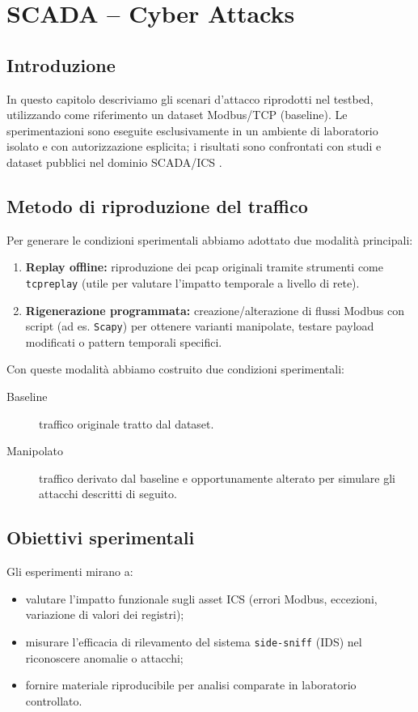 \chapter{SCADA -- Cyber Attacks}
\label{ch:scada_attacks}

\section{Introduzione}
In questo capitolo descriviamo gli scenari d'attacco riprodotti nel testbed, utilizzando come riferimento un dataset Modbus/TCP (baseline).  
Le sperimentazioni sono eseguite esclusivamente in un ambiente di laboratorio isolato e con autorizzazione esplicita; i risultati sono confrontati con studi e dataset pubblici nel dominio SCADA/ICS \cite{scadaAttacks,DatasetModbus}.

\section{Metodo di riproduzione del traffico}
Per generare le condizioni sperimentali abbiamo adottato due modalità principali:
\begin{enumerate}
  \item \textbf{Replay offline:} riproduzione dei pcap originali tramite strumenti come \texttt{tcpreplay} (utile per valutare l'impatto temporale a livello di rete).
  \item \textbf{Rigenerazione programmata:} creazione/alterazione di flussi Modbus con script (ad es. \texttt{Scapy}) per ottenere varianti manipolate, testare payload modificati o pattern temporali specifici.
\end{enumerate}
Con queste modalità abbiamo costruito due condizioni sperimentali:
\begin{description}
  \item[Baseline] traffico originale tratto dal dataset.
  \item[Manipolato] traffico derivato dal baseline e opportunamente alterato per simulare gli attacchi descritti di seguito.
\end{description}

\section{Obiettivi sperimentali}
Gli esperimenti mirano a:
\begin{itemize}
  \item valutare l'impatto funzionale sugli asset ICS (errori Modbus, eccezioni, variazione di valori dei registri);
  \item misurare l'efficacia di rilevamento del sistema \texttt{side-sniff} (IDS) nel riconoscere anomalie o attacchi;
  \item fornire materiale riproducibile per analisi comparate in laboratorio controllato.
\end{itemize}


